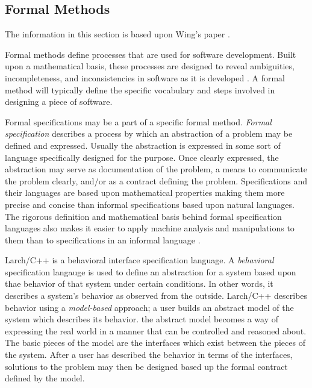 \documentclass[12pt]{article} %
\begin{document}
\subsection{Formal Methods}

The information in this section is based upon Wing's
paper \cite{Wing90a}. 

Formal methods define processes that are used for software
development. Built upon a mathematical basis, these processes are
designed to reveal ambiguities, incompleteness, and inconsistencies in
software as it is developed \cite{Wing90a}. A formal method will
typically define the specific vocabulary and steps involved in
designing a piece of software.

Formal specifications may be a part of a specific formal
method. \emph{Formal specification} describes a process by which an
abstraction of a problem may be defined and expressed. Usually the
abstraction is expressed in some sort of language specifically
designed for the purpose. Once clearly expressed, the abstraction may serve
as documentation of the problem, a means to communicate the problem
clearly, and/or as a contract defining the problem. Specifications and
their languages are based upon mathematical properties making
them more precise and concise than informal specifications based upon
natural languages. The rigorous definition and mathematical basis
behind formal specification languages also makes it easier to apply machine
analysis and manipulations to them than to specifications in an
informal language \cite{Wing90a}.

Larch/C++ is a behavioral interface specification language. A \emph{behavioral}
specification langauge is used to define an abstraction for a system
based upon thae behavior of that system under certain conditions. In
other words, it describes a system's behavior as observed from the
outside. Larch/C++ describes behavior using a
\emph{model-based} approach; a user builds an abstract model of the system
which describes its behavior. the abstract model becomes a way of
expressing the real world in a manner that can be controlled and
reasoned about. The basic pieces of the model are the interfaces which
exist between the pieces of the system. After a user has described the
behavior in terms of the interfaces, solutions to the problem may then
be designed based up the formal contract defined by the model.

\end{document}
